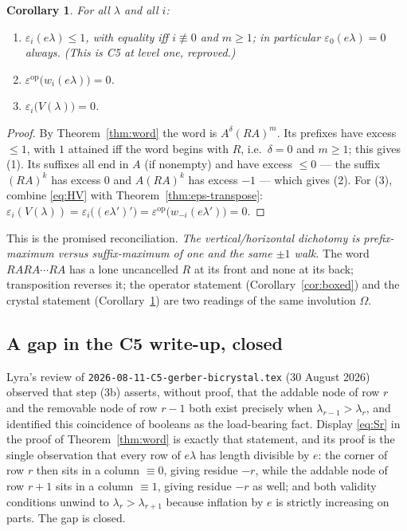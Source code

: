 \documentclass[11pt]{article}
\theoremstyle{plain}
\newtheorem{corollary}[theorem]{Corollary}
\theoremstyle{definition}
\newcommand{\Om}{\Omega}
\begin{document}
\begin{corollary}\label{cor:dichotomy}
For all $\lambda$ and all $i$:
\begin{enumerate}
\item $\varepsilon_i(e\lambda)\le1$, with equality iff $i\not\equiv0$ and
  $m\ge1$; in particular $\varepsilon_0(e\lambda)=0$ always.  \emph{(This is
  C5 at level one, reproved.)}
\item $\varepsilon^{\mathrm{op}}\bigl(w_i(e\lambda)\bigr)=0$.
\item $\varepsilon_i\bigl(V(\lambda)\bigr)=0$.
\end{enumerate}
\end{corollary}
\begin{proof}
By Theorem~\ref{thm:word} the word is $A^\delta(RA)^m$.  Its prefixes have
excess $\le1$, with $1$ attained iff the word begins with $R$, i.e.\ $\delta=0$
and $m\ge1$; this gives (1).  Its suffixes all end in $A$ (if nonempty) and
have excess $\le0$ --- the suffix $(RA)^k$ has excess $0$ and
$A(RA)^k$ has excess $-1$ --- which gives (2).  For (3), combine
\eqref{eq:HV} with Theorem~\ref{thm:eps-transpose}:
$\varepsilon_i(V(\lambda))=\varepsilon_i\bigl((e\lambda')'\bigr)
=\varepsilon^{\mathrm{op}}\bigl(w_{-i}(e\lambda')\bigr)=0$.
\end{proof}

This is the promised reconciliation.  \emph{The vertical/horizontal dichotomy
is prefix-maximum versus suffix-maximum of one and the same $\pm1$ walk.}  The
word $RARA\cdots RA$ has a lone uncancelled $R$ at its front and none at its
back; transposition reverses it; the operator statement
(Corollary~\ref{cor:boxed}) and the crystal statement
(Corollary~\ref{cor:dichotomy}) are two readings of the same involution $\Om$.

\subsection{A gap in the C5 write-up, closed}

Lyra's review of \texttt{2026-08-11-C5-gerber-bicrystal.tex} (30 August 2026)
observed that step (3b) asserts, without proof, that the addable node of row
$r$ and the removable node of row $r-1$ both exist precisely when
$\lambda_{r-1}>\lambda_{r}$, and identified this coincidence of booleans as
the load-bearing fact.  Display \eqref{eq:Sr} in the proof of
Theorem~\ref{thm:word} is exactly that statement, and its proof is the single
observation that every row of $e\lambda$ has length divisible by $e$: the
corner of row $r$ then sits in a column $\equiv0$, giving residue $-r$, while
the addable node of row $r+1$ sits in a column $\equiv1$, giving residue
$-r$ as well; and both validity conditions unwind to $\lambda_r>\lambda_{r+1}$
because inflation by $e$ is strictly increasing on parts.  The gap is closed.
\end{document}
